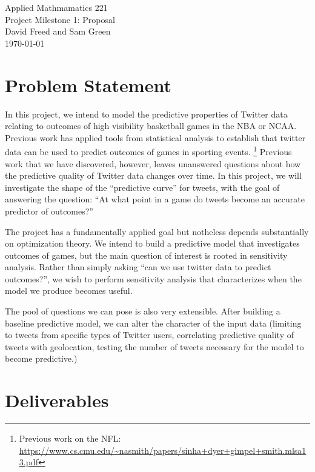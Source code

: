 \documentclass[12pt]{article}
\begin{document}
\begin{center}
{\Large Applied Mathmamatics 221}\\
Project Milestone 1: Proposal\\
David Freed and Sam Green\\
\today
\end{center}

\section{Problem Statement}

In this project, we intend to model the predictive 
properties of Twitter data relating to outcomes
of high visibility basketball games in the NBA
or NCAA. Previous work has applied tools from 
statistical analysis to establish that
twitter data can be used to predict outcomes
of games in sporting events. \footnote{Previous work on the NFL: \url{https://www.cs.cmu.edu/~nasmith/papers/sinha+dyer+gimpel+smith.mlsa13.pdf}} Previous work that we have discovered,
however, leaves unanswered questions about how the predictive quality
of Twitter data changes over time. In this project, we will investigate
the shape of the ``predictive curve'' for tweets, with the goal of answering
the question: ``At what point in a game do tweets become an accurate predictor of outcomes?''

The project has a fundamentally applied goal but notheless depends substantially
on optimization theory. We intend to build a predictive model that investigates
outcomes of games, but the main question of interest is rooted in sensitivity
analysis. Rather than simply asking ``can we use twitter data to predict outcomes?'',
we wish to perform sensitivity analysis that characterizes when the model 
we produce becomes useful. 

The pool of questions we can pose is also very extensible. After building 
a baseline predictive model, we can alter the character of the input data
(limiting to tweets from specific types of Twitter users, correlating predictive
quality of tweets with geolocation, testing the number of tweets necessary 
for the model to become predictive.) 

\section{Deliverables}
\end{document}
